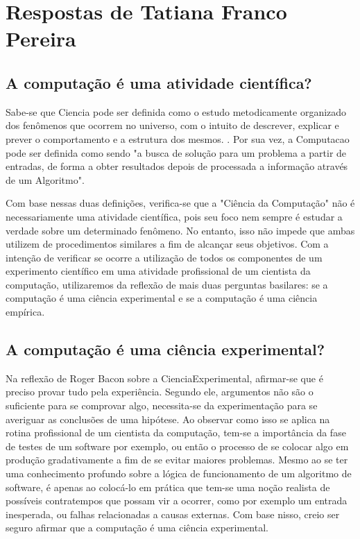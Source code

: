 \section{Respostas de Tatiana Franco Pereira\label{tarefa-Tatianafp-componentes-eperimento}}

\subsection{A computação é uma atividade científica? }

Sabe-se que \gls{Ciencia} pode ser definida como o estudo metodicamente organizado dos fenômenos que ocorrem no universo, com o intuito de descrever, explicar e prever o comportamento e a estrutura dos mesmos. . Por sua vez, a \gls{Computacao} pode ser definida como sendo "a busca de solução para um problema a partir de entradas, de forma a obter resultados depois de processada a informação através de um \gls{Algoritmo}". 

Com base nessas duas definições, verifica-se que a "Ciência da Computação" não é necessariamente uma atividade científica, pois seu foco nem sempre é estudar a verdade sobre um determinado fenômeno. No entanto, isso não impede que ambas utilizem de procedimentos similares a fim de alcançar seus objetivos. Com a intenção de verificar se ocorre a utilização de todos os componentes de um experimento científico em uma atividade profissional de um cientista da computação, utilizaremos da reflexão de mais duas perguntas basilares: se a computação é uma ciência experimental e se a computação é uma ciência empírica.  

\subsection{A computação é uma ciência experimental? }

Na reflexão de Roger Bacon sobre a \gls{CienciaExperimental}, afirmar-se que é preciso provar tudo pela experiência. Segundo ele, argumentos não são o suficiente para se comprovar algo, necessita-se da experimentação para se averiguar as conclusões de uma hipótese. Ao observar como isso se aplica na rotina profissional de um cientista da computação, tem-se a importância da fase de testes de um software por exemplo, ou então o processo de se colocar algo em produção gradativamente a fim de se evitar maiores problemas. Mesmo ao se ter uma conhecimento profundo sobre a lógica de funcionamento de um algoritmo de software, é apenas ao colocá-lo em prática que tem-se uma noção realista de possíveis contratempos que possam vir a ocorrer, como por exemplo um entrada inesperada, ou falhas relacionadas a causas externas. Com base nisso, creio ser seguro afirmar que a computação é uma ciência experimental.

